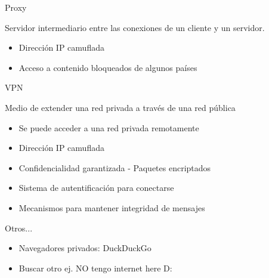 \documentclass[spanish]{beamer}
\begin{document}
\begin{frame}{Proxy}
	
Servidor intermediario entre las conexiones de un cliente y un servidor. \\

\vspace{2.9em}
\begin{itemize}
	\item Dirección IP camuflada \\
	\item Acceso a contenido bloqueados de algunos países \\ 
\end{itemize}
	
\end{frame}





\begin{frame}{VPN}

Medio de extender una red privada a través de una red pública

\vspace{1.9em}

\begin{itemize}
	\item Se puede acceder a una red privada remotamente \\
	\item Dirección IP camuflada \\ 
	\item Confidencialidad garantizada - Paquetes encriptados \\
	\item Sistema de autentificación para conectarse
	\item Mecanismos para mantener integridad de mensajes
\end{itemize}	

\end{frame}






\begin{frame}{Otros...}

\begin{itemize}
	\item Navegadores privados: DuckDuckGo
	\item Buscar otro ej. NO tengo internet here D:
\end{itemize}

\end{frame}
\end{document}
